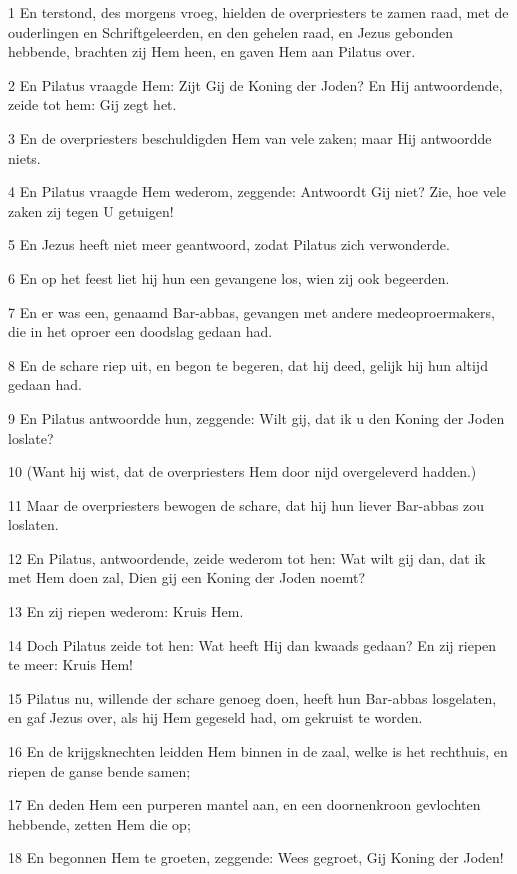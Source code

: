 \par 1 En terstond, des morgens vroeg, hielden de overpriesters te zamen raad, met de ouderlingen en Schriftgeleerden, en den gehelen raad, en Jezus gebonden hebbende, brachten zij Hem heen, en gaven Hem aan Pilatus over.
\par 2 En Pilatus vraagde Hem: Zijt Gij de Koning der Joden? En Hij antwoordende, zeide tot hem: Gij zegt het.
\par 3 En de overpriesters beschuldigden Hem van vele zaken; maar Hij antwoordde niets.
\par 4 En Pilatus vraagde Hem wederom, zeggende: Antwoordt Gij niet? Zie, hoe vele zaken zij tegen U getuigen!
\par 5 En Jezus heeft niet meer geantwoord, zodat Pilatus zich verwonderde.
\par 6 En op het feest liet hij hun een gevangene los, wien zij ook begeerden.
\par 7 En er was een, genaamd Bar-abbas, gevangen met andere medeoproermakers, die in het oproer een doodslag gedaan had.
\par 8 En de schare riep uit, en begon te begeren, dat hij deed, gelijk hij hun altijd gedaan had.
\par 9 En Pilatus antwoordde hun, zeggende: Wilt gij, dat ik u den Koning der Joden loslate?
\par 10 (Want hij wist, dat de overpriesters Hem door nijd overgeleverd hadden.)
\par 11 Maar de overpriesters bewogen de schare, dat hij hun liever Bar-abbas zou loslaten.
\par 12 En Pilatus, antwoordende, zeide wederom tot hen: Wat wilt gij dan, dat ik met Hem doen zal, Dien gij een Koning der Joden noemt?
\par 13 En zij riepen wederom: Kruis Hem.
\par 14 Doch Pilatus zeide tot hen: Wat heeft Hij dan kwaads gedaan? En zij riepen te meer: Kruis Hem!
\par 15 Pilatus nu, willende der schare genoeg doen, heeft hun Bar-abbas losgelaten, en gaf Jezus over, als hij Hem gegeseld had, om gekruist te worden.
\par 16 En de krijgsknechten leidden Hem binnen in de zaal, welke is het rechthuis, en riepen de ganse bende samen;
\par 17 En deden Hem een purperen mantel aan, en een doornenkroon gevlochten hebbende, zetten Hem die op;
\par 18 En begonnen Hem te groeten, zeggende: Wees gegroet, Gij Koning der Joden!
